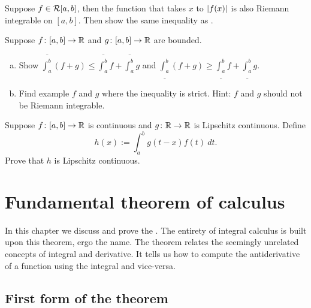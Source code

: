 \begin{exercise}[Challenging] \label{exercise:hardabsint}
Suppose $f \in {\mathcal{R}}[a,b]$, then the function that takes $x$ to
$\left\lvert {f(x)} \right\rvert$ is also Riemann integrable on $[a,b]$.
Then show the same inequality as .
\end{exercise}

\begin{exercise}  \label{exercise:upperlowerlinineq}
Suppose $f \colon [a,b] \to {\mathbb{R}}$ and $g \colon [a,b] \to {\mathbb{R}}$
are bounded.
\begin{enumerate}[a)]
\item
Show
$\overline{\int_a^b} (f+g) \leq \overline{\int_a^b}f+\overline{\int_a^b}g$ and
$\underline{\int_a^b} (f+g) \geq
\underline{\int_a^b}f+\underline{\int_a^b}g$.
\item
Find example $f$ and $g$ where
the inequality is strict.  Hint: $f$ and $g$ should not be Riemann
integrable.
\end{enumerate}
\end{exercise}

\begin{exercise}
Suppose $f \colon [a,b] \to {\mathbb{R}}$ is continuous and $g \colon {\mathbb{R}} \to {\mathbb{R}}$ is
Lipschitz continuous.  Define
\begin{equation*}
h(x) := \int_a^b g(t-x) f(t) ~ dt .
\end{equation*}
Prove that $h$ is Lipschitz continuous.
\end{exercise}


\sectionnewpage
\section{Fundamental theorem of calculus}
\label{sec:ftc}


In this chapter we discuss and prove the
\emph{}.
The entirety of integral calculus is built upon this theorem,
ergo the name.
The theorem relates the seemingly unrelated concepts of integral and
derivative.  It tells us how to compute the antiderivative of a function
using the integral and vice-versa.

\subsection{First form of the theorem}

